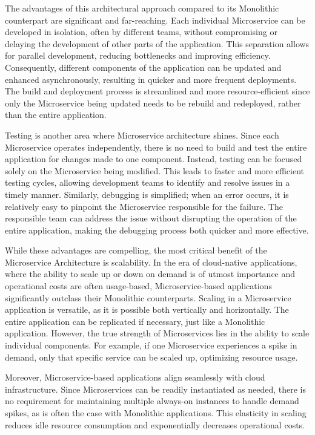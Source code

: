 The advantages of this architectural approach compared to its Monolithic counterpart are significant and far-reaching. Each individual Microservice can be developed in isolation, often by different teams, without compromising or delaying the development of other parts of the application. This separation allows for parallel development, reducing bottlenecks and improving efficiency. Consequently, different components of the application can be updated and enhanced asynchronously, resulting in quicker and more frequent deployments. The build and deployment process is streamlined and more resource-efficient since only the Microservice being updated needs to be rebuild and redeployed, rather than the entire application.

Testing is another area where Microservice architecture shines. Since each Microservice operates independently, there is no need to build and test the entire application for changes made to one component. Instead, testing can be focused solely on the Microservice being modified. This leads to faster and more efficient testing cycles, allowing development teams to identify and resolve issues in a timely manner. Similarly, debugging is simplified; when an error occurs, it is relatively easy to pinpoint the Microservice responsible for the failure. The responsible team can address the issue without disrupting the operation of the entire application, making the debugging process both quicker and more effective.

While these advantages are compelling, the most critical benefit of the Microservice Architecture is scalability. In the era of cloud-native applications, where the ability to scale up or down on demand is of utmost importance and operational costs are often usage-based, Microservice-based applications significantly outclass their Monolithic counterparts. Scaling in a Microservice application is versatile, as it is possible both vertically and horizontally. The entire application can be replicated if necessary, just like a Monolithic application. However, the true strength of Microservices lies in the ability to scale individual components. For example, if one Microservice experiences a spike in demand, only that specific service can be scaled up, optimizing resource usage.

Moreover, Microservice-based applications align seamlessly with cloud infrastructure. Since Microservices can be readily instantiated as needed, there is no requirement for maintaining multiple always-on instances to handle demand spikes, as is often the case with Monolithic applications. This elasticity in scaling reduces idle resource consumption and exponentially decreases operational costs.

